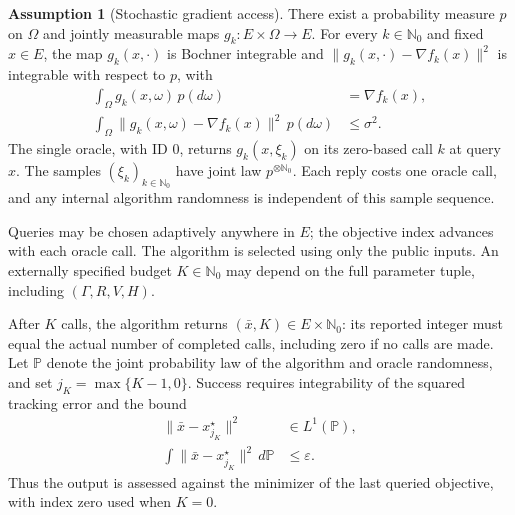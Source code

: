\documentclass[10pt]{article}
\theoremstyle{definition}
\newtheorem{assumption}{Assumption}
\begin{document}
\begin{assumption}[Stochastic gradient access]
There exist a probability measure $p$ on $\Omega$ and jointly measurable maps $g_k:E\times\Omega\to E$. For every $k\in\mathbb{N}_0$ and fixed $x\in E$, the map $g_k(x,\cdot)$ is Bochner integrable and $\|g_k(x,\cdot)-\nabla f_k(x)\|^2$ is integrable with respect to $p$, with
\[
\begin{aligned}
\int_\Omega g_k(x,\omega)\,p(d\omega)&=\nabla f_k(x),\\
\int_\Omega\|g_k(x,\omega)-\nabla f_k(x)\|^2\,p(d\omega)&\leq\sigma^2.
\end{aligned}
\]
The single oracle, with ID $0$, returns $g_k(x,\xi_k)$ on its zero-based call $k$ at query $x$. The samples $(\xi_k)_{k\in\mathbb{N}_0}$ have joint law $p^{\otimes\mathbb{N}_0}$. Each reply costs one oracle call, and any internal algorithm randomness is independent of this sample sequence.
\end{assumption}

Queries may be chosen adaptively anywhere in $E$; the objective index advances with each oracle call. The algorithm is selected using only the public inputs. An externally specified budget $K\in\mathbb{N}_0$ may depend on the full parameter tuple, including $(\Gamma,R,V,H)$.

After $K$ calls, the algorithm returns $(\bar{x},K)\in E\times\mathbb{N}_0$: its reported integer must equal the actual number of completed calls, including zero if no calls are made. Let $\mathbb{P}$ denote the joint probability law of the algorithm and oracle randomness, and set $j_K=\max\{K-1,0\}$. Success requires integrability of the squared tracking error and the bound
\[
\begin{aligned}
\|\bar{x}-x_{j_K}^\star\|^2&\in L^1(\mathbb{P}),\\
\int\|\bar{x}-x_{j_K}^\star\|^2\,d\mathbb{P}&\leq\varepsilon.
\end{aligned}
\]
Thus the output is assessed against the minimizer of the last queried objective, with index zero used when $K=0$.
\end{document}
